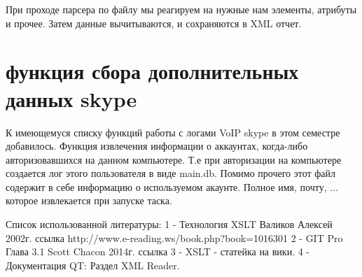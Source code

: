 При проходе парсера по файлу мы реагируем на нужные нам элементы, атрибуты и прочее. Затем данные вычитываются, и сохраняются в XML отчет.
\chapter*{функция сбора дополнительных данных skype}
К имеющемуся списку функций работы с логами VoIP skype в этом семестре добавилось. Функция извлечения информации о аккаунтах, когда-либо авторизовавшихся на данном компьютере. Т.е при авторизации на компьютере создается лог этого пользователя в виде main.db. Помимо прочего этот файл содержит в себе информацию о используемом акаунте. Полное имя, почту, ... которое извлекается при запуске таска.



Список использованной литературы:
1 -  Технология XSLT Валиков Алексей 2002г. ссылка http://www.e-reading.ws/book.php?book=1016301
2 -  GIT Pro Глава 3.1 Scott Chacon 2014г. ссылка 
3 -  XSLT - статейка на вики.
4 -  Документация QT: Раздел XML Reader.
